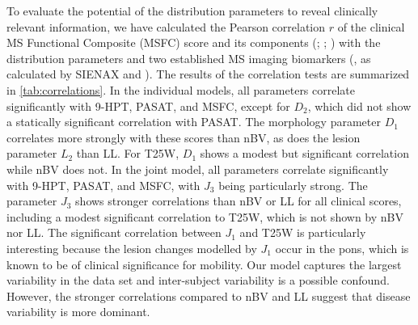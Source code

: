 To evaluate the potential of the distribution parameters to reveal clinically
relevant information, we have calculated the Pearson correlation $r$ of the
clinical MS Functional Composite (MSFC) score \citep{fischer1999} and its
components (; ; ) with
the distribution parameters and two established MS imaging biomarkers
(, as calculated by SIENAX
\citep{smith2002} and ). The results of the
correlation tests are summarized in \ref{tab:correlations}. In the individual
models, all parameters correlate significantly with 9-HPT, PASAT, and MSFC,
except for $D_2$, which did not show a statically significant correlation with
PASAT. The morphology parameter $D_1$ correlates more strongly with these scores
than nBV, as does the lesion parameter $L_2$ than LL. For T25W, $D_1$ shows a
modest but significant correlation while nBV does not. In the joint model, all
parameters correlate significantly with 9-HPT, PASAT, and MSFC, with $J_3$ being
particularly strong. The parameter $J_3$ shows stronger correlations than nBV or
LL for all clinical scores, including a modest significant correlation to T25W,
which is not shown by nBV nor LL. The significant correlation between $J_1$ and
T25W is particularly interesting because the lesion changes modelled by $J_1$
occur in the pons, which is known to be of clinical significance for mobility.
Our model captures the largest variability in the data set and inter-subject
variability is a possible confound. However, the stronger correlations compared
to nBV and LL suggest that disease variability is more dominant.



